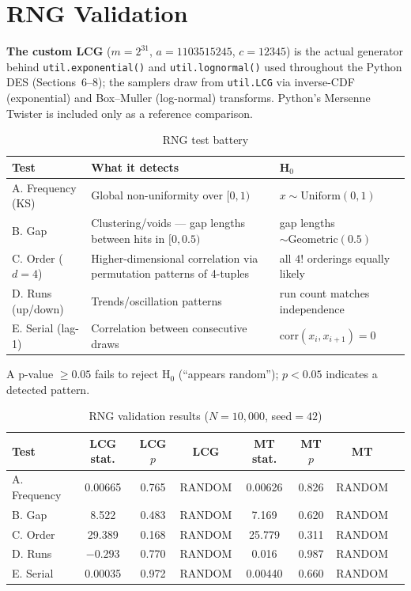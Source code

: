 \documentclass[11pt,a4paper]{article}
\begin{document}
\appendix

\section{RNG Validation}

\textbf{The custom LCG} ($m=2^{31}$, $a=1103515245$, $c=12345$) is the actual generator behind
\texttt{util.exponential()} and \texttt{util.lognormal()} used throughout the Python DES
(Sections~6--8); the samplers draw from \texttt{util.LCG} via inverse-CDF (exponential) and
Box--Muller (log-normal) transforms. Python's Mersenne Twister is included only as a reference comparison.

\begin{table}[H]
\centering
\caption{RNG test battery}
\begin{tabularx}{\linewidth}{lXl}
\toprule
\textbf{Test} & \textbf{What it detects} & \textbf{H$_0$} \\
\midrule
A. Frequency (KS) & Global non-uniformity over $[0,1)$ & $x \sim \text{Uniform}(0,1)$ \\
B. Gap            & Clustering/voids --- gap lengths between hits in $[0, 0.5)$ & gap lengths $\sim \text{Geometric}(0.5)$ \\
C. Order ($d=4$)  & Higher-dimensional correlation via permutation patterns of 4-tuples & all $4!$ orderings equally likely \\
D. Runs (up/down) & Trends/oscillation patterns & run count matches independence \\
E. Serial (lag-1) & Correlation between consecutive draws & $\text{corr}(x_i, x_{i+1}) = 0$ \\
\bottomrule
\end{tabularx}
\end{table}

A p-value $\geq 0.05$ fails to reject H$_0$ (``appears random''); $p < 0.05$ indicates a detected pattern.

\begin{table}[H]
\centering
\caption{RNG validation results ($N=10{,}000$, seed$=42$)}
\begin{tabular}{lccccccc}
\toprule
\textbf{Test} & \textbf{LCG stat.} & \textbf{LCG $p$} & \textbf{LCG} & \textbf{MT stat.} & \textbf{MT $p$} & \textbf{MT} \\
\midrule
A. Frequency & 0.00665 & 0.765 & RANDOM & 0.00626 & 0.826 & RANDOM \\
B. Gap       & 8.522   & 0.483 & RANDOM & 7.169   & 0.620 & RANDOM \\
C. Order     & 29.389  & 0.168 & RANDOM & 25.779  & 0.311 & RANDOM \\
D. Runs      & $-0.293$ & 0.770 & RANDOM & 0.016  & 0.987 & RANDOM \\
E. Serial    & 0.00035 & 0.972 & RANDOM & 0.00440 & 0.660 & RANDOM \\
\bottomrule
\end{tabular}
\end{table}
\end{document}

